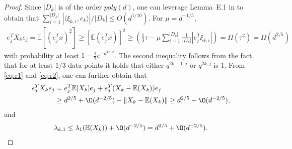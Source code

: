\documentclass[a4paper,11pt]{article}
\begin{document}
\begin{proof}
Since $|D_k|$ is of the order $poly(d)$, one can leverage Lemma~E.1 in \cite{liu2021self} to obtain that $\sum_{i=1}^{|D_k|} |\langle \xi_{k, i}, e_k \rangle| /|D_k| \leq O(d^{1/10})$. For $\mu = d^{-1/5}$,
\begin{align*}
    e_j^T X_k e_j  = \mathbb{E}[(e_j^Tx)^2] \geq [\mathbb{E}(e_j^T x)]^2 \geq (\frac{1}{3}\tau - \mu \sum_{i=1}^{|D_k|} \frac{1}{|D_k|}|e_j^T \xi_{k, i}| ) = \Omega(\tau^2) = \Omega(d^{2/5})
\end{align*}
with probability at least $1-\frac{1}{2}e^{-d^{1/10}}$. The second inequality follows from the fact that for at least $1/3$ data points it holds that either $q^{2k-1, j}$ or $q^{2k, j}$ is $1$. From \eqref{eq:r1} and \eqref{eq:r2}, one can further obtain that
\begin{equation}
\begin{aligned}
    e_j^T X_k e_j & = e_j^T \mathbb{E}[X_k] e_j + e_j^T (X_k - \mathbb{E}(X_k)) e_j  \\
    & \geq d^{2/5} + \O(d^{-2/5}) - \|X_k - \mathbb{E}(X_k) \| \geq d^{2/5} - \O(d^{-2/5}), \label{eq:r3}
\end{aligned}
\end{equation}
and
\begin{equation}
    \begin{aligned}
        \lambda_{k, 1} \leq \lambda_1(\mathbb{E}(X_k)) + \O(d^{-2/5}) = d^{2/5} + \O(d^{-2/5}).
    \end{aligned}
\end{equation}


\end{proof}
\end{document}

